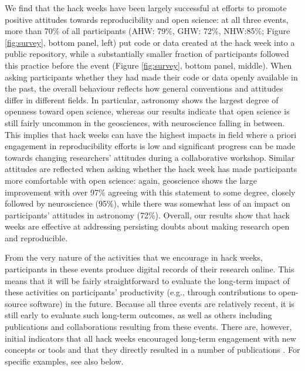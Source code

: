 We find that the hack weeks have been largely successful at efforts to promote positive attitudes towards reproducibility and open science: at all three events, more than 70\% of all participants (AHW: 79\%, GHW: 72\%, NHW:85\%; Figure \ref{fig:survey}, bottom panel, left) put code or data created at the hack week into a public repository, while a substantially smaller fraction of participants followed this practice before the event (Figure \ref{fig:survey}, bottom panel, middle).
When asking participants whether they had made their code or data openly available in the past, the overall behaviour reflects how general conventions and attitudes differ in different fields.
In particular, astronomy shows the largest degree of openness toward open science, whereas our results indicate that open science is still fairly uncommon in the geosciences, with neuroscience falling in between.
This implies that hack weeks can have the highest impacts in field where a priori engagement in reproducibility efforts is low and significant progress can be made towards changing researchers' attitudes during a collaborative workshop.
Similar attitudes are reflected when asking whether the hack week has made participants more comfortable with open science: again, geoscience shows the large improvement with over 97\% agreeing with this statement to some degree, closely followed by neuroscience (95\%), while there was somewhat less of an impact on participants' attitudes in astronomy (72\%).
Overall, our results show that hack weeks are effective at addressing persisting doubts about making research open and reproducible.

From the very nature of the activities that we encourage in hack weeks, participants in these events produce digital records of their research online. This means that it will be fairly straightforward to evaluate the long-term impact of these activities on participants' productivity (e.g., through contributions to open-source software) in the future. Because all three events are relatively recent, it is still early to evaluate such long-term outcomes, as well as others including publications and collaborations resulting from these events.
There are, however, initial indicators that all hack weeks encouraged long-term engagement with new concepts or tools and that they directly resulted in a number of publications \cite{gullysantiago2015,faria2016,keshavan2017,leonard2017,jordan2017,peterson2017,hahn2017,pricewhelan2017}. For specific examples, see also below.

